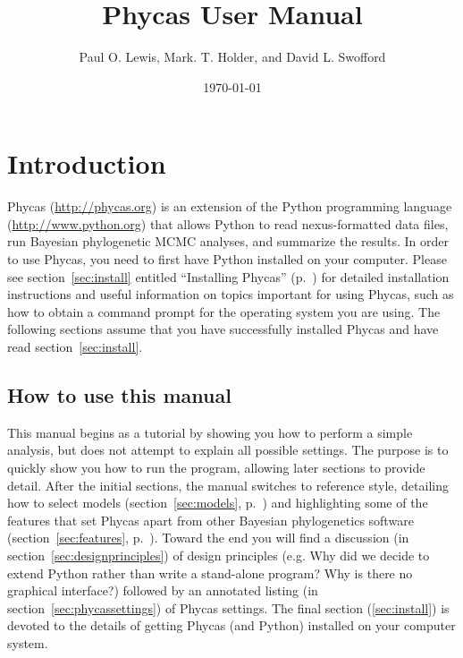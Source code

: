 \documentclass[10pt]{article}
\begin{document}
\title{Phycas User Manual}
\author{Paul O. Lewis, Mark. T. Holder, and David L. Swofford}
\date{\today}
\maketitle

\tableofcontents

\section{Introduction}

Phycas (\url{http://phycas.org}) is an extension of the Python programming language (\url{http://www.python.org}) that allows Python to read nexus-formatted data files, run Bayesian phylogenetic MCMC analyses, and summarize the results. In order to use Phycas, you need to first have Python installed on your computer. Please see section~\ref{sec:install} entitled ``Installing Phycas'' (p.~\pageref{sec:install}) for detailed installation instructions and useful information on topics important for using Phycas, such as how to obtain a command prompt for the operating system you are using. The following sections assume that you have successfully installed Phycas and have read section~\ref{sec:install}.

\subsection{How to use this manual}
This manual begins as a tutorial by showing you how to perform a simple analysis, but does not attempt to explain all possible settings. The purpose is to quickly show you how to run the program, allowing later sections to provide detail. After the initial sections, the manual switches to reference style, detailing how to select models (section~\ref{sec:models}, p.~\pageref{sec:models}) and highlighting some of the features that set Phycas apart from other Bayesian phylogenetics software (section~\ref{sec:features}, p.~\pageref{sec:features}). Toward the end you will find a discussion (in section~\ref{sec:designprinciples}) of design principles (e.g. Why did we decide to extend Python rather than write a stand-alone program? Why is there no graphical interface?) followed by an annotated listing (in section~\ref{sec:phycassettings}) of Phycas settings. The final section (\ref{sec:install}) is devoted to the details of getting Phycas (and Python) installed on your computer system.
\end{document}
